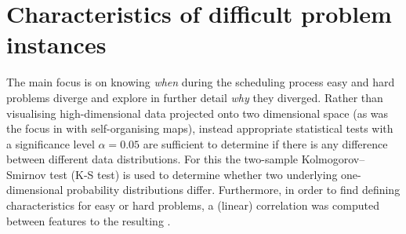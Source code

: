 \begin{comment}
\begin{figure}
\centering
\texttt{[image: figures/\{j.rnd]}/{trdat.prob.moveIsOptimal.10x10.feat.minmax}.pdf}
\caption{Probability of extremal feature being optimal for \jrnd}
\label{fig:diff:j.rnd:opt:minmax}
\end{figure}
\begin{figure}
\centering
\texttt{[image: figures/\{j.rndn]}/{trdat.prob.moveIsOptimal.10x10.feat.minmax}.pdf}
\caption{Probability of extremal feature being optimal for \jrndn}
\label{fig:diff:j.rndn:opt:minmax}
\end{figure}

\begin{figure}
\centering
\texttt{[image: figures/\{f.rnd]}/{trdat.prob.moveIsOptimal.10x10.feat.minmax}.pdf}
\caption{Probability of extremal feature being optimal for \frnd{10}{10}}
\label{fig:diff:f.rnd:opt:minmax}
\end{figure}
\end{comment}





\section{Characteristics of difficult problem instances}

The main focus is on knowing \emph{when} during the scheduling process easy and hard problems diverge and explore in further detail \emph{why} they diverged. Rather than visualising high-dimensional data projected onto two dimensional space (as was the focus in \cite{SmithMilesLion5} with self-organising maps), instead appropriate statistical tests with a significance level $\alpha=0.05$ are sufficient to determine if there is any difference between different data distributions. For this the two-sample Kolmogorov–Smirnov test (K-S test) is used to determine whether two underlying one-dimensional probability distributions differ. 
Furthermore, in order to find defining characteristics for easy or hard problems, a (linear) correlation was computed between features to the resulting \namerho.

